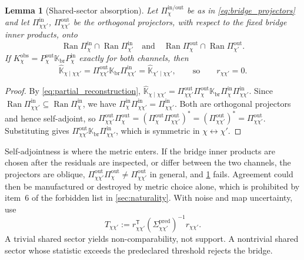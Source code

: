 \documentclass[11pt]{article}
\newtheorem{lemma}{Lemma}
\begin{document}
\begin{lemma}[Shared-sector absorption]
\label{lem:absorption}
Let \(\Pi_{\chi}^{\mathrm{in/out}}\) be as in \cref{eq:bridge_projectors} and let \(\Pi_{\chi\chi'}^{\mathrm{in}}\), \(\Pi_{\chi\chi'}^{\mathrm{out}}\) be the \emph{orthogonal} projectors, with respect to the fixed bridge inner products, onto
\begin{equation}
\operatorname{Ran}\Pi_{\chi}^{\mathrm{in}}\cap\operatorname{Ran}\Pi_{\chi'}^{\mathrm{in}}
\quad\text{and}\quad
\operatorname{Ran}\Pi_{\chi}^{\mathrm{out}}\cap\operatorname{Ran}\Pi_{\chi'}^{\mathrm{out}}.
\end{equation}
If \(K_{\chi}^{\mathrm{obs}}=P_{\chi}^{\mathrm{out}}\mathbb K_{\mathrm{br}}P_{\chi}^{\mathrm{in}}\) exactly for both channels, then
\begin{equation}
\widehat{\mathbb K}_{\chi\mid\chi\chi'}
=\Pi_{\chi\chi'}^{\mathrm{out}}\mathbb K_{\mathrm{br}}\Pi_{\chi\chi'}^{\mathrm{in}}
=\widehat{\mathbb K}_{\chi'\mid\chi\chi'},
\qquad\text{so}\qquad
r_{\chi\chi'}=0.
\end{equation}
\end{lemma}

\begin{proof}
By \cref{eq:partial_reconstruction}, \(\widehat{\mathbb K}_{\chi\mid\chi\chi'}=\Pi_{\chi\chi'}^{\mathrm{out}}\Pi_{\chi}^{\mathrm{out}}\mathbb K_{\mathrm{br}}\Pi_{\chi}^{\mathrm{in}}\Pi_{\chi\chi'}^{\mathrm{in}}\). Since \(\operatorname{Ran}\Pi_{\chi\chi'}^{\mathrm{in}}\subseteq\operatorname{Ran}\Pi_{\chi}^{\mathrm{in}}\), we have \(\Pi_{\chi}^{\mathrm{in}}\Pi_{\chi\chi'}^{\mathrm{in}}=\Pi_{\chi\chi'}^{\mathrm{in}}\). Both are orthogonal projectors and hence self-adjoint, so \(\Pi_{\chi\chi'}^{\mathrm{out}}\Pi_{\chi}^{\mathrm{out}}=(\Pi_{\chi}^{\mathrm{out}}\Pi_{\chi\chi'}^{\mathrm{out}})^{*}=(\Pi_{\chi\chi'}^{\mathrm{out}})^{*}=\Pi_{\chi\chi'}^{\mathrm{out}}\). Substituting gives \(\Pi_{\chi\chi'}^{\mathrm{out}}\mathbb K_{\mathrm{br}}\Pi_{\chi\chi'}^{\mathrm{in}}\), which is symmetric in \(\chi\leftrightarrow\chi'\).
\end{proof}

Self-adjointness is where the metric enters. If the bridge inner products are chosen after the residuals are inspected, or differ between the two channels, the projectors are oblique, \(\Pi_{\chi\chi'}^{\mathrm{out}}\Pi_{\chi}^{\mathrm{out}}\neq\Pi_{\chi\chi'}^{\mathrm{out}}\) in general, and \cref{lem:absorption} fails. Agreement could then be manufactured or destroyed by metric choice alone, which is prohibited by item~6 of the forbidden list in \cref{sec:naturality}. With noise and map uncertainty, use
\begin{equation}
T_{\chi\chi'}
:=r_{\chi\chi'}^{\mathsf T}
\left(\Sigma_{\chi\chi'}^{\mathrm{pred}}\right)^{-1}
r_{\chi\chi'}.
\label{eq:shared_statistic}
\end{equation}
A trivial shared sector yields non-comparability, not support. A nontrivial shared sector whose statistic exceeds the predeclared threshold rejects the bridge.
\end{document}
